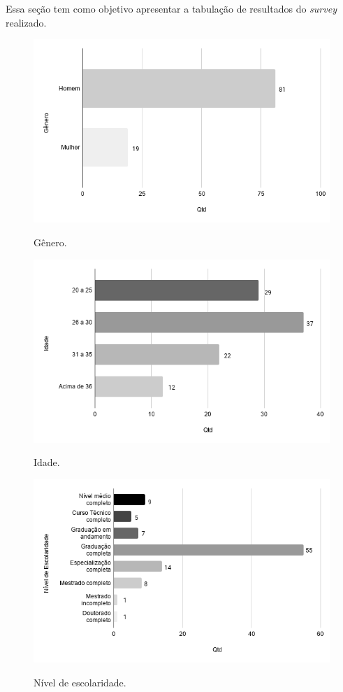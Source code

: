 \label{sec:resultadospesquisa}


Essa seção tem como objetivo apresentar a tabulação de resultados do \textit{survey} realizado.



        \begin{figure}[!htb]
        \centering
        \includegraphics[width=.70\textwidth]{images/s_genero.png}
        \label{figure:s_genero}
        \caption{Gênero.}
        \end{figure}
    
    
        \begin{figure}[!htb]
        \centering
        \includegraphics[width=.70\textwidth]{images/s_idade.png}
        \label{figure:s_idade}
        \caption{Idade.}
        \end{figure}
    
    
        \begin{figure}[!htb]
        \centering
        \includegraphics[width=.70\textwidth]{images/s_escolaridade.png}
        \label{figure:s_escolaridade}
        \caption{Nível de escolaridade.}
        \end{figure}
    
